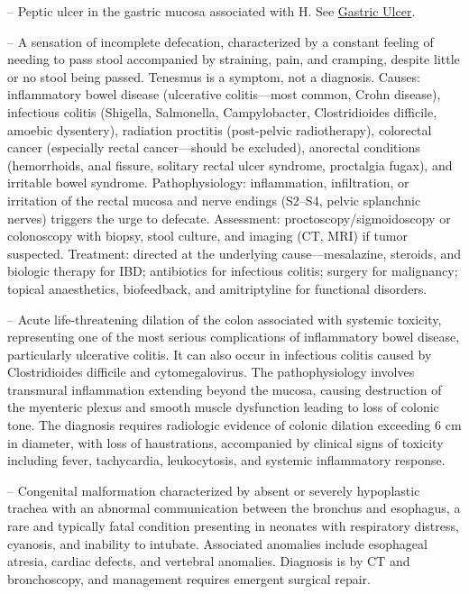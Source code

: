 -- Peptic ulcer in the gastric mucosa associated with H. See \hyperlink{Gastric Ulcer}{Gastric Ulcer}.

-- A sensation of incomplete defecation, characterized by a constant feeling of needing to pass stool accompanied by straining, pain, and cramping, despite little or no stool being passed. Tenesmus is a symptom, not a diagnosis. Causes: inflammatory bowel disease (ulcerative colitis—most common, Crohn disease), infectious colitis (Shigella, Salmonella, Campylobacter, Clostridioides difficile, amoebic dysentery), radiation proctitis (post-pelvic radiotherapy), colorectal cancer (especially rectal cancer—should be excluded), anorectal conditions (hemorrhoids, anal fissure, solitary rectal ulcer syndrome, proctalgia fugax), and irritable bowel syndrome. Pathophysiology: inflammation, infiltration, or irritation of the rectal mucosa and nerve endings (S2--S4, pelvic splanchnic nerves) triggers the urge to defecate. Assessment: proctoscopy/sigmoidoscopy or colonoscopy with biopsy, stool culture, and imaging (CT, MRI) if tumor suspected. Treatment: directed at the underlying cause—mesalazine, steroids, and biologic therapy for IBD; antibiotics for infectious colitis; surgery for malignancy; topical anaesthetics, biofeedback, and amitriptyline for functional disorders.

-- Acute life-threatening dilation of the colon associated with systemic toxicity, representing one of the most serious complications of inflammatory bowel disease, particularly ulcerative colitis. It can also occur in infectious colitis caused by Clostridioides difficile and cytomegalovirus. The pathophysiology involves transmural inflammation extending beyond the mucosa, causing destruction of the myenteric plexus and smooth muscle dysfunction leading to loss of colonic tone. The diagnosis requires radiologic evidence of colonic dilation exceeding 6 cm in diameter, with loss of haustrations, accompanied by clinical signs of toxicity including fever, tachycardia, leukocytosis, and systemic inflammatory response.

-- Congenital malformation characterized by absent or severely hypoplastic trachea with an abnormal communication between the bronchus and esophagus, a rare and typically fatal condition presenting in neonates with respiratory distress, cyanosis, and inability to intubate. Associated anomalies include esophageal atresia, cardiac defects, and vertebral anomalies. Diagnosis is by CT and bronchoscopy, and management requires emergent surgical repair.

